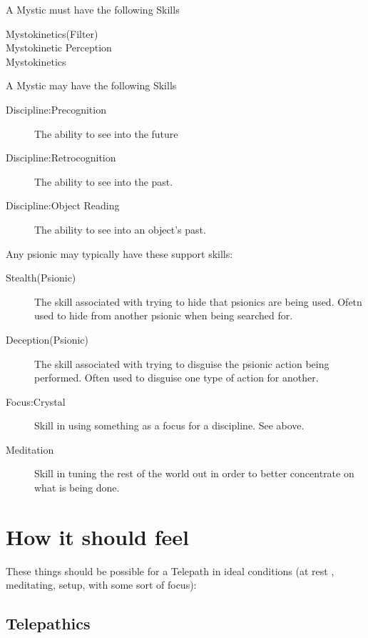 \documentclass{book}
\begin{document}
A Mystic must have the following Skills

\begin{description}
    \item[Mystokinetics(Filter)]
    \item[Mystokinetic Perception]
    \item[Mystokinetics]
\end{description}

A Mystic may have the following Skills

\begin{description}
    \item[Discipline:Precognition]
    The ability to see into the future
    \item[Discipline:Retrocognition]
    The ability to see into the past.
    \item[Discipline:Object Reading]
    The ability to see into an object's past.
\end{description}

Any psionic may typically have these support skills:

\begin{description}
    \item[Stealth(Psionic)]
    The skill associated with trying to hide that psionics are being
    used. Ofetn used to hide from another psionic when being
    searched for. 
    \item[Deception(Psionic)]
    The skill associated with trying to disguise the psionic action being
    performed. Often used to disguise one type of action for another.
    \item[Focus:Crystal]
    Skill in using something as a focus for a discipline. See above.
    \item[Meditation]
    Skill in tuning the rest of the world out in order to better
    concentrate on what is being done.
\end{description}

\section{How it should feel}

These things should be possible for a Telepath in ideal conditions (at
rest , meditating, setup, with some sort of focus):

\subsection{Telepathics}
\end{document}
